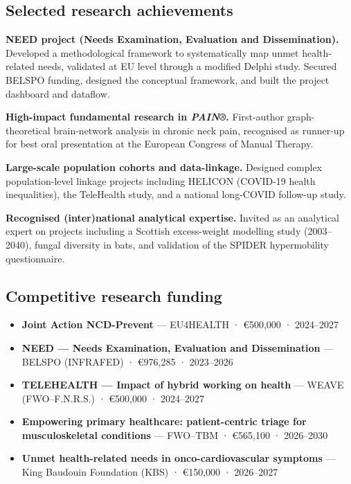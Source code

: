 \documentclass[
  letterpaper,
  DIV=11,
  numbers=noendperiod]{scrartcl}
\providecommand{\tightlist}{%
  \setlength{\itemsep}{0pt}\setlength{\parskip}{0pt}}\usepackage{longtable,booktabs,array}
\begin{document}
\subsection{Selected research achievements}\label{achievements}

\textbf{NEED project (Needs Examination, Evaluation and Dissemination).}
Developed a methodological framework to systematically map unmet
health-related needs, validated at EU level through a modified Delphi
study. Secured BELSPO funding, designed the conceptual framework, and
built the project dashboard and dataflow.

\textbf{High-impact fundamental research in \emph{PAIN®}.} First-author
graph-theoretical brain-network analysis in chronic neck pain,
recognised as runner-up for best oral presentation at the European
Congress of Manual Therapy.

\textbf{Large-scale population cohorts and data-linkage.} Designed
complex population-level linkage projects including HELICON (COVID-19
health inequalities), the TeleHealth study, and a national long-COVID
follow-up study.

\textbf{Recognised (inter)national analytical expertise.} Invited as an
analytical expert on projects including a Scottish excess-weight
modelling study (2003--2040), fungal diversity in bats, and validation
of the SPIDER hypermobility questionnaire.

\subsection{Competitive research funding}\label{funding}

\begin{itemize}
\tightlist
\item
  \textbf{Joint Action NCD-Prevent} --- EU4HEALTH · €500,000 ·
  2024--2027
\item
  \textbf{NEED --- Needs Examination, Evaluation and Dissemination} ---
  BELSPO (INFRAFED) · €976,285 · 2023--2026
\item
  \textbf{TELEHEALTH --- Impact of hybrid working on health} --- WEAVE
  (FWO--F.N.R.S.) · €500,000 · 2024--2027
\item
  \textbf{Empowering primary healthcare: patient-centric triage for
  musculoskeletal conditions} --- FWO--TBM · €565,100 · 2026--2030
\item
  \textbf{Unmet health-related needs in onco-cardiovascular symptoms}
  --- King Baudouin Foundation (KBS) · €150,000 · 2026--2027
\end{itemize}
\end{document}
